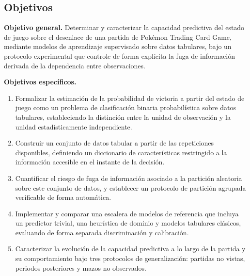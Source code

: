 

\subsection{Objetivos}
\label{subsec:objetivos}

\noindent\textbf{Objetivo general.} Determinar y caracterizar la capacidad
predictiva del estado de juego sobre el desenlace de una partida de
Pok\'emon Trading Card Game, mediante modelos de aprendizaje supervisado
sobre datos tabulares, bajo un protocolo experimental que controle de forma
explícita la fuga de información derivada de la dependencia entre
observaciones.

\noindent\textbf{Objetivos específicos.}
\begin{enumerate}
  \item Formalizar la estimación de la probabilidad de victoria a partir
        del estado de juego como un problema de clasificación binaria
        probabilística sobre datos tabulares, estableciendo la distinción
        entre la unidad de observación y la unidad estadísticamente
        independiente.
  \item Construir un conjunto de datos tabular a partir de las
        repeticiones disponibles, definiendo un diccionario de
        características restringido a la información accesible en el
        instante de la decisión.
  \item Cuantificar el riesgo de fuga de información asociado a la
        partición aleatoria sobre este conjunto de datos, y establecer un
        protocolo de partición agrupada verificable de forma automática.
  \item Implementar y comparar una escalera de modelos de referencia que
        incluya un predictor trivial, una heurística de dominio y modelos
        tabulares clásicos, evaluando de forma separada discriminación y
        calibración.
  \item Caracterizar la evolución de la capacidad predictiva a lo largo de
        la partida y su comportamiento bajo tres protocolos de
        generalización: partidas no vistas, periodos posteriores y mazos
        no observados.
\end{enumerate}

